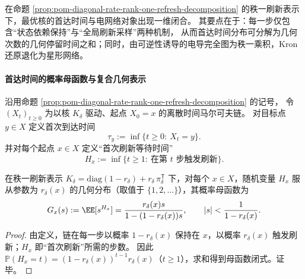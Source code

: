 在命题 \ref{prop:pom-diagonal-rate-rank-one-refresh-decomposition} 的秩一刷新表示下，最优核的首达时间与电网络对象出现一维闭合。
其要点在于：每一步仅包含“状态依赖保持”与“全局刷新采样”两种机制，
从而首达时间分布可分解为几何次数的几何停留时间之和；同时，由可逆性诱导的电导完全图为秩一乘积，Kron 还原退化为星形网络。

\paragraph{首达时间的概率母函数与复合几何表示}
沿用命题 \ref{prop:pom-diagonal-rate-rank-one-refresh-decomposition} 的记号，
令 \((X_t)_{t\ge 0}\) 为以核 \(K_\delta\) 驱动、起点 \(X_0=x\) 的离散时间马尔可夫链。
对目标点 \(y\in X\) 定义首次到达时间
\[
\tau_y:=\inf\{t\ge 0:\ X_t=y\}.
\]
并对每个起点 \(x\in X\) 定义“首次刷新等待时间”
\[
H_x:=\inf\{t\ge 1:\ \text{在第 \(t\) 步触发刷新}\}.
\]

\begin{lemma}[几何停留时间的母函数]\label{lem:pom-diagonal-rate-refresh-holding-time-pgf}
在秩一刷新表示
\(
K_\delta=\mathrm{diag}(1-r_\delta)+r_\delta\,\pi_\delta^{\mathsf T}
\)
下，对每个 \(x\in X\)，随机变量 \(H_x\) 服从参数为 \(r_\delta(x)\) 的几何分布（取值于 \(\{1,2,\dots\}\)），其概率母函数为
\[
G_x(s):=\EE[s^{H_x}]=\frac{r_\delta(x)s}{1-(1-r_\delta(x))s},
\qquad |s|<\frac{1}{1-r_\delta(x)}.
\]
\end{lemma}
\begin{proof}
由定义，链在每一步以概率 \(1-r_\delta(x)\) 保持在 \(x\)，以概率 \(r_\delta(x)\) 触发刷新；\(H_x\) 即“首次刷新”所需的步数。
因此 \(\mathbb P(H_x=t)=(1-r_\delta(x))^{t-1}r_\delta(x)\)（\(t\ge 1\)），求和得到母函数闭式。证毕。
\end{proof}

